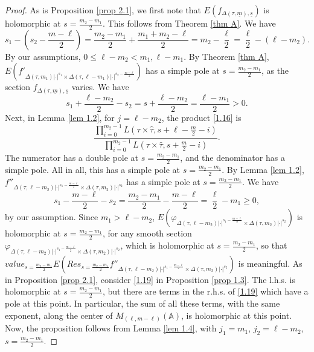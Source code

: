 \documentclass[12pts]{amsart}
\newcommand{\BA}{{\mathbb {A}}}
\begin{document}
\begin{proof}
	As is Proposition \ref{prop 2.1}, we first note that $E(f_{\Delta(\tau,\underline{m}),\underline{s}})$ is holomorphic at $s=\frac{m_2-m_1}{2}$. This follows from Theorem \ref{thm A}. We have
	$$
	s_1-(s_2-\frac{m-\ell}{2})=\frac{m_2-m_1}{2}+\frac{m_1+m_2-\ell}{2}=m_2-\frac{\ell}{2}=\frac{\ell}{2}-(\ell-m_2).
	$$
	By our assumptions, $0\leq \ell-m_2<m_1, \ell-m_1$. By Theorem \ref{thm A},\\
	 $E(f'_{\Delta(\tau,m_1)|\cdot|^{s_1}\times \Delta(\tau,\ell-m_1)|\cdot|^{s_2-\frac{m-\ell}{2}}})$ has a simple pole at $s=\frac{m_2-m_1}{2}$, as the section $f_{\Delta(\tau,\underline{m}),\underline{s}}$ varies. We have
	 $$
	 s_1+\frac{\ell-m_2}{2}-s_2=s+\frac{\ell-m_2}{2}=\frac{\ell-m_1}{2}>0.
	 $$
	 Next, in Lemma \ref{lem 1.2}, for $j=\ell-m_2$, the product \eqref{1.16} is
	 $$
	 \frac{\prod_{i=0}^{m_2-1}L(\tau\times\hat{\tau},s+\ell-\frac{m}{2}-i)}{\prod_{i=0}^{m_2-1}L(\tau\times\hat{\tau},s+\frac{m}{2}-i)}.
	 	$$
	 	The numerator has a double pole at $s=\frac{m_2-m_1}{2}$, and the denominator has a simple pole. All in all, this has a simple pole at $s=\frac{m_2-m_1}{2}$. By Lemma \ref{lem 1.2}, $f''_{\Delta(\tau,\ell-m_2)|\cdot|^{s_1-\frac{m-\ell}{2}}\times \Delta(\tau,m_2)|\cdot|^{s_2}}$ has a simple pole at $s=\frac{m_2-m_1}{2}$. We have
	 	$$
	 	s_1-\frac{m-\ell}{2}-s_2=\frac{m_2-m_1}{2}-\frac{m-\ell}{2}=\frac{\ell}{2}-m_1\geq 0,
	 	$$
	 	by our assumption. Since $m_1>\ell-m_2$, $E(\varphi_{\Delta(\tau,\ell-m_2)|\cdot|^{s_1-\frac{m-\ell}{2}}\times \Delta(\tau,m_2)|\cdot|^{s_2}})$ is holomorphic at $s=\frac{m_2-m_1}{2}$, for any smooth section $\varphi_{\Delta(\tau,\ell-m_2)|\cdot|^{s_1-\frac{m-\ell}{2}}\times \Delta(\tau,m_2)|\cdot|^{s_2}}$, which is holomorphic at $s=\frac{m_2-m_1}{2}$, so that\\ $value_{s=\frac{m_2-m_1}{2}}E(Res_{s=\frac{m_2-m_1}{2}}f''_{\Delta(\tau,\ell-m_2)|\cdot|^{s_1-\frac{m-\ell}{2}}\times \Delta(\tau,m_2)|\cdot|^{s_2}})$ is meaningful. 
	 	As in Proposition \ref{prop 2.1}, consider \eqref{1.19} in Proposition \ref{prop 1.3}. The l.h.s. is holomorphic at $s=\frac{m_2-m_1}{2}$, but there are terms in the r.h.s. of \eqref{1.19} which have a pole at this point. In particular, the sum of all these terms, with the same exponent, along the center of $M_{(\ell,m-\ell)}(\BA)$, is holomorphic at this point. Now, the proposition follows from Lemma \ref{lem 1.4}, with $j_1=m_1$, $j_2=\ell-m_2$, $s=\frac{m_2-m_1}{2}$.
	 	 
	 	
	
\end{proof}	
    	
\end{document}
